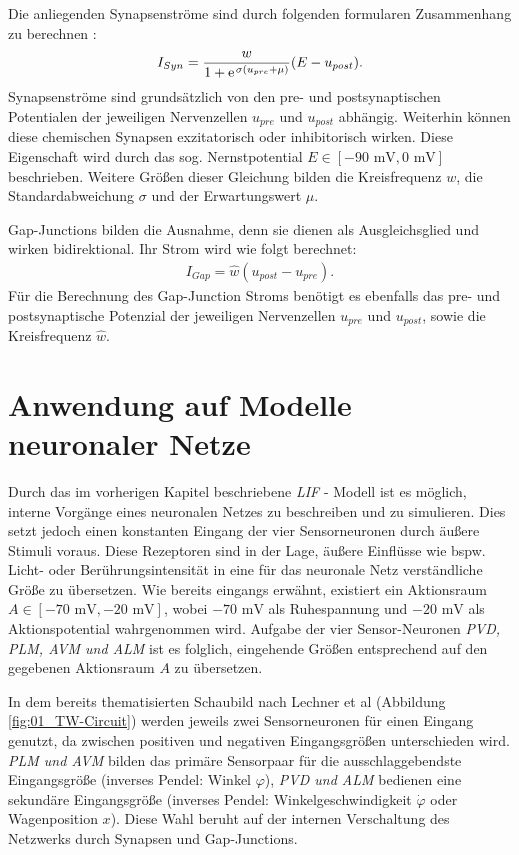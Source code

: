 	Die anliegenden Synapsenströme sind durch folgenden formularen Zusammenhang zu berechnen \cite{WormLevelRL}:
	\begin{align}
		\label{eq:chem_syn_current}
		I_{Syn} = \frac{w}{1 + \e^{\sigma(u_{pre} + \mu)}}(E - u_{post})\text{.}
	\end{align}
	Synapsenströme sind grundsätzlich von den pre- und postsynaptischen Potentialen der jeweiligen Nervenzellen $u_{pre}$ und $u_{post}$ abhängig. Weiterhin können diese chemischen Synapsen exzitatorisch oder inhibitorisch wirken. Diese Eigenschaft wird durch das sog. Nernstpotential $E\in[-90\text{ mV}, 0\text{ mV}]$ beschrieben. Weitere Größen dieser Gleichung bilden die Kreisfrequenz $w$, die Standardabweichung $\sigma$ und der Erwartungswert $\mu$.
	
	Gap-Junctions bilden die Ausnahme, denn sie dienen als Ausgleichsglied und wirken bidirektional. Ihr Strom wird wie folgt berechnet:
	\begin{align}
		\label{eq:gap_syn_current}
		I_{Gap} = \hat{w}(u_{post} - u_{pre})\text{.}
	\end{align}
	Für die Berechnung des Gap-Junction Stroms benötigt es ebenfalls das pre- und postsynaptische Potenzial der jeweiligen Nervenzellen $u_{pre}$ und $u_{post}$, sowie die Kreisfrequenz $\hat{w}$.
	
\section{Anwendung auf Modelle neuronaler Netze}
\label{sec:lif_neuro}
	Durch das im vorherigen Kapitel beschriebene \textit{LIF} - Modell ist es möglich, interne Vorgänge eines neuronalen Netzes zu beschreiben und zu simulieren. Dies setzt jedoch einen konstanten Eingang der vier Sensorneuronen durch äußere Stimuli voraus. Diese Rezeptoren sind in der Lage, äußere Einflüsse wie bspw. Licht- oder Berührungsintensität in eine für das neuronale Netz verständliche Größe zu übersetzen. Wie bereits eingangs erwähnt, existiert ein Aktionsraum $A\in[-70\text{ mV}, -20\text{ mV}]$, wobei $-70\text{ mV}$ als Ruhespannung und $-20\text{ mV}$ als Aktionspotential wahrgenommen wird. Aufgabe der vier Sensor-Neuronen \textit{PVD, PLM, AVM und ALM} ist es folglich, eingehende Größen entsprechend auf den gegebenen Aktionsraum $A$ zu übersetzen.
	
	In dem bereits thematisierten Schaubild nach Lechner et al (Abbildung \ref{fig:01_TW-Circuit}) werden jeweils zwei Sensorneuronen für einen Eingang genutzt, da zwischen positiven und negativen Eingangsgrößen unterschieden wird. \textit{PLM und AVM} bilden das primäre Sensorpaar für die ausschlaggebendste Eingangsgröße (inverses Pendel: Winkel $\varphi$), \textit{PVD und ALM} bedienen eine sekundäre Eingangsgröße (inverses Pendel: Winkelgeschwindigkeit $\dot{\varphi}$ oder Wagenposition $x$). Diese Wahl beruht auf der internen Verschaltung des Netzwerks durch Synapsen und Gap-Junctions.
	
